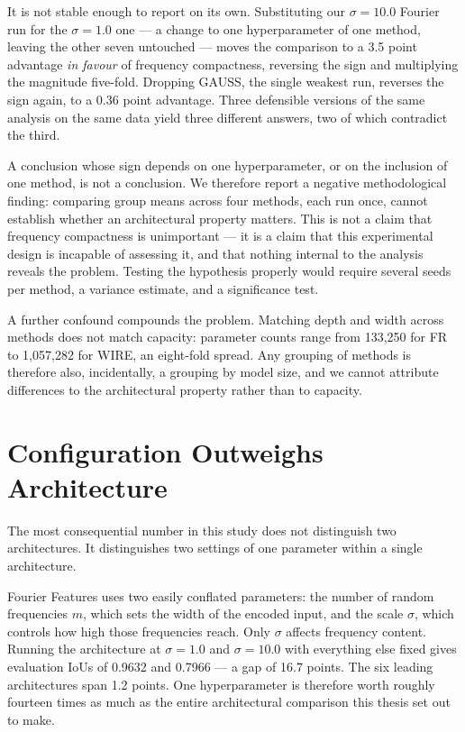 It is not stable enough to report on its own. Substituting our $\sigma = 10.0$ Fourier run for the $\sigma = 1.0$ one --- a change to one hyperparameter of one method, leaving the other seven untouched --- moves the comparison to a 3.5 point advantage \emph{in favour} of frequency compactness, reversing the sign and multiplying the magnitude five-fold. Dropping GAUSS, the single weakest run, reverses the sign again, to a 0.36 point advantage. Three defensible versions of the same analysis on the same data yield three different answers, two of which contradict the third.

A conclusion whose sign depends on one hyperparameter, or on the inclusion of one method, is not a conclusion. We therefore report a negative methodological finding: comparing group means across four methods, each run once, cannot establish whether an architectural property matters. This is not a claim that frequency compactness is unimportant --- it is a claim that this experimental design is incapable of assessing it, and that nothing internal to the analysis reveals the problem. Testing the hypothesis properly would require several seeds per method, a variance estimate, and a significance test.

A further confound compounds the problem. Matching depth and width across methods does not match capacity: parameter counts range from 133{,}250 for FR to 1{,}057{,}282 for WIRE, an eight-fold spread. Any grouping of methods is therefore also, incidentally, a grouping by model size, and we cannot attribute differences to the architectural property rather than to capacity.

\section{Configuration Outweighs Architecture}

The most consequential number in this study does not distinguish two architectures. It distinguishes two settings of one parameter within a single architecture.

Fourier Features uses two easily conflated parameters: the number of random frequencies $m$, which sets the width of the encoded input, and the scale $\sigma$, which controls how high those frequencies reach. Only $\sigma$ affects frequency content. Running the architecture at $\sigma = 1.0$ and $\sigma = 10.0$ with everything else fixed gives evaluation IoUs of 0.9632 and 0.7966 --- a gap of 16.7 points. The six leading architectures span 1.2 points. One hyperparameter is therefore worth roughly fourteen times as much as the entire architectural comparison this thesis set out to make.

